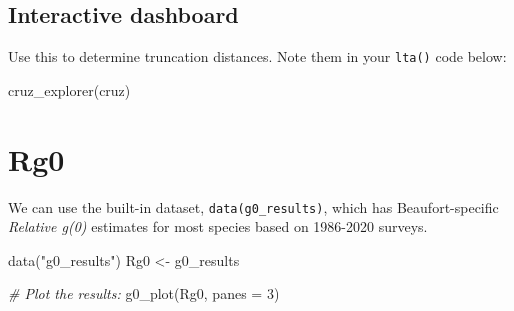\documentclass[
]{book}
\newenvironment{Shaded}{\begin{snugshade}}{\end{snugshade}}
\newcommand{\AttributeTok}[1]{\textcolor[rgb]{0.77,0.63,0.00}{#1}}
\newcommand{\CommentTok}[1]{\textcolor[rgb]{0.56,0.35,0.01}{\textit{#1}}}
\newcommand{\DecValTok}[1]{\textcolor[rgb]{0.00,0.00,0.81}{#1}}
\newcommand{\FunctionTok}[1]{\textcolor[rgb]{0.00,0.00,0.00}{#1}}
\newcommand{\NormalTok}[1]{#1}
\newcommand{\OtherTok}[1]{\textcolor[rgb]{0.56,0.35,0.01}{#1}}
\newcommand{\StringTok}[1]{\textcolor[rgb]{0.31,0.60,0.02}{#1}}
\begin{document}
\hypertarget{interactive-dashboard-1}{%
\subsection*{Interactive dashboard}\label{interactive-dashboard-1}}

Use this to determine truncation distances. Note them in your \texttt{lta()} code below:

\begin{Shaded}
\begin{Highlighting}[]
\FunctionTok{cruz\_explorer}\NormalTok{(cruz)}
\end{Highlighting}
\end{Shaded}

\hypertarget{rg0-1}{%
\section*{Rg0}\label{rg0-1}}

We can use the built-in dataset, \texttt{data(g0\_results)}, which has Beaufort-specific \emph{Relative g(0)} estimates for most species based on 1986-2020 surveys.

\begin{Shaded}
\begin{Highlighting}[]
\FunctionTok{data}\NormalTok{(}\StringTok{"g0\_results"}\NormalTok{)}
\NormalTok{Rg0 }\OtherTok{\textless{}{-}}\NormalTok{ g0\_results}
\end{Highlighting}
\end{Shaded}

\begin{Shaded}
\begin{Highlighting}[]
\CommentTok{\# Plot the results: }
\FunctionTok{g0\_plot}\NormalTok{(Rg0, }\AttributeTok{panes =} \DecValTok{3}\NormalTok{)}
\end{Highlighting}
\end{Shaded}
\end{document}
